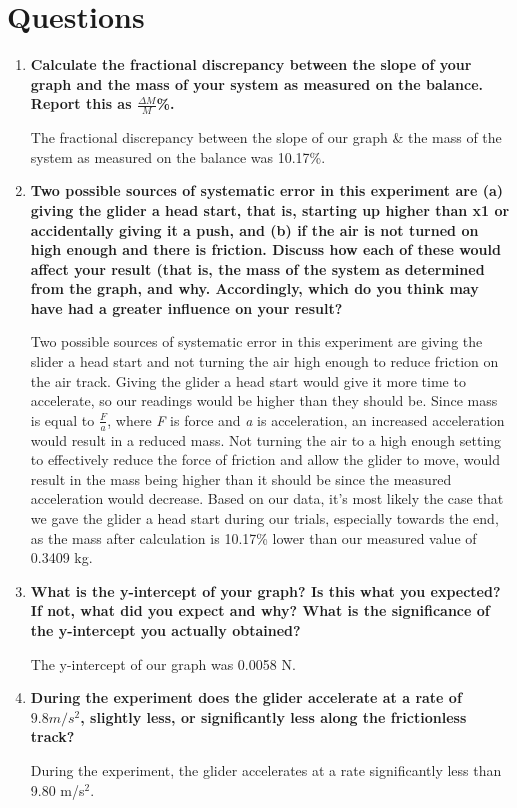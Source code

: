 
 \section{Questions}

\vspace{-0.5cm}
\singlespacing

\begin{enumerate}
	\item \textbf{Calculate the fractional discrepancy between the slope of your graph and the mass of your system as measured on the balance. Report this as $\frac{\Delta{M}}{M}$\%.}

		The fractional discrepancy between the slope of our graph \& the mass of the system as measured on the balance was 10.17\%. 	

	\item \textbf{Two possible sources of systematic error in this experiment are (a) giving the glider a head start, that is, starting up higher than x1 or accidentally giving it a push, and (b) if the air is not turned on high enough and there is friction. Discuss how each of these would affect your result (that is, the mass of the system as determined from the graph, and why. Accordingly, which do you think may have had a greater influence on your result?}

		Two possible sources of systematic error in this experiment are giving the slider a head start and not turning the air high enough to reduce friction on the air track. Giving the glider a head start would give it more time to accelerate, so our readings would be higher than they should be. Since mass is equal to $\frac{F}{a}$, where \textit{F} is force and \textit{a} is acceleration, an increased acceleration would result in a reduced mass. Not turning the air to a high enough setting to effectively reduce the force of friction and allow the glider to move, would result in the mass being higher than it should be since the measured acceleration would decrease. Based on our data, it's most likely the case that we gave the glider a head start during our trials, especially towards the end, as the mass after calculation is 10.17\% lower than our measured value of 0.3409 kg. \par

\item \textbf{What is the y-intercept of your graph? Is this what you expected? If not, what did you expect and why? What is the significance of the y-intercept you actually obtained?}

The y-intercept of our graph was 0.0058 N. 

\item \textbf{During the experiment does the glider accelerate at a rate of $9.8 m/s^2$, slightly less, or significantly less along the frictionless track?}

During the experiment, the glider accelerates at a rate significantly less than 9.80 m/s$^2$.

\end{enumerate}

\newpage
